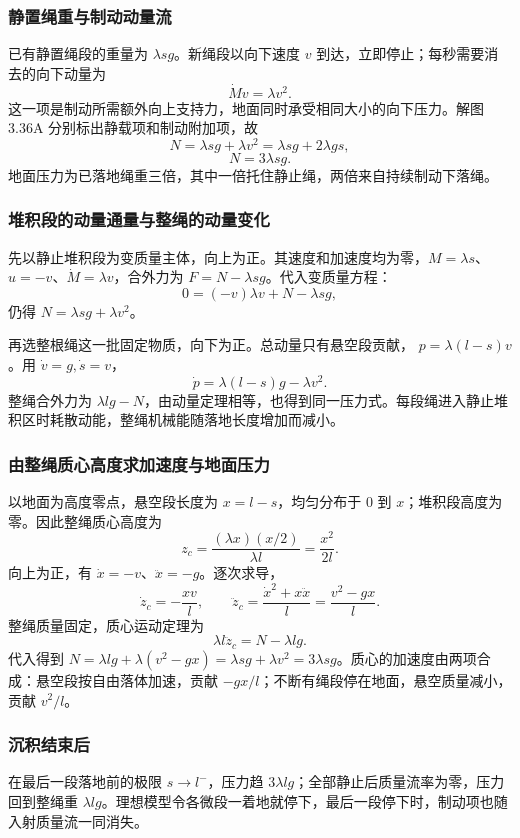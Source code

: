 \documentclass[UTF8,fontset=fandol,a4paper,11pt]{ctexart}
\begin{document}
\subsubsection*{静置绳重与制动动量流}
已有静置绳段的重量为 $\lambda sg$。新绳段以向下速度 $v$ 到达，立即停止；每秒需要消去的向下动量为
\[
\dot M v=\lambda v^2.
\]
这一项是制动所需额外向上支持力，地面同时承受相同大小的向下压力。解图 3.36A 分别标出静载项和制动附加项，故
\[
N=\lambda sg+\lambda v^2
=\lambda sg+2\lambda gs,
\]
\[
\boxed{N=3\lambda sg}.
\]
地面压力为已落地绳重三倍，其中一倍托住静止绳，两倍来自持续制动下落绳。

\subsubsection*{堆积段的动量通量与整绳的动量变化}
先以静止堆积段为变质量主体，向上为正。其速度和加速度均为零，$M=\lambda s$、$u=-v$、$\dot M=\lambda v$，合外力为 $F=N-\lambda sg$。代入变质量方程：
\[
0=(-v)\lambda v+N-\lambda sg,
\]
仍得 $N=\lambda sg+\lambda v^2$。

再选整根绳这一批固定物质，向下为正。总动量只有悬空段贡献，
$p=\lambda(l-s)v$。用 $\dot v=g,\dot s=v$，
\[
\dot p=\lambda(l-s)g-\lambda v^2.
\]
整绳合外力为 $\lambda lg-N$，由动量定理相等，也得到同一压力式。每段绳进入静止堆积区时耗散动能，整绳机械能随落地长度增加而减小。

\subsubsection*{由整绳质心高度求加速度与地面压力}
以地面为高度零点，悬空段长度为 $x=l-s$，均匀分布于 $0$ 到 $x$；堆积段高度为零。因此整绳质心高度为
\[
z_c=\frac{(\lambda x)(x/2)}{\lambda l}=\frac{x^2}{2l}.
\]
向上为正，有 $\dot x=-v$、$\ddot x=-g$。逐次求导，
\[
\dot z_c=-\frac{xv}{l},\qquad
\ddot z_c=\frac{\dot x^2+x\ddot x}{l}
=\frac{v^2-gx}{l}.
\]
整绳质量固定，质心运动定理为
\[
\lambda l\ddot z_c=N-\lambda lg.
\]
代入得到 $N=\lambda lg+\lambda(v^2-gx)=\lambda sg+\lambda v^2=3\lambda sg$。质心的加速度由两项合成：悬空段按自由落体加速，贡献 $-gx/l$；不断有绳段停在地面，悬空质量减小，贡献 $v^2/l$。

\subsubsection*{沉积结束后}
在最后一段落地前的极限 $s\to l^-$，压力趋 $3\lambda lg$；全部静止后质量流率为零，压力回到整绳重 $\lambda lg$。理想模型令各微段一着地就停下，最后一段停下时，制动项也随入射质量流一同消失。
\end{document}
